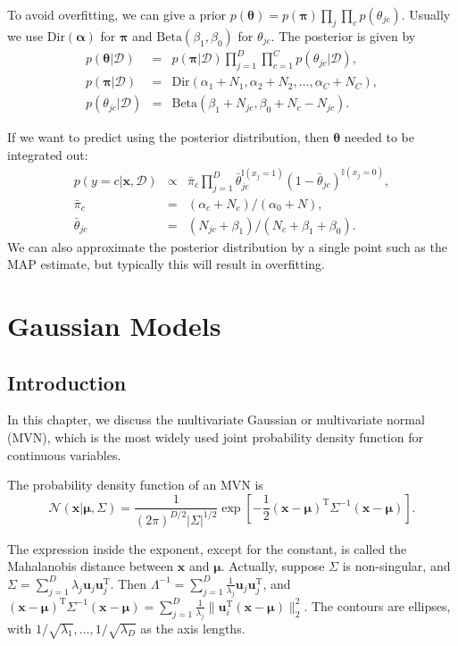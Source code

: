 \documentclass[openany]{book}
\begin{document}
To avoid overfitting, we can give a prior $p(\boldsymbol{\theta})=p(\boldsymbol{\pi})\prod_j\prod_cp(\theta_{jc})$. Usually we use $\mathrm{Dir}(\boldsymbol{\alpha})$ for $\boldsymbol{\pi}$ and $\mathrm{Beta}(\beta_1,\beta_0)$ for $\theta_{jc}$. The posterior is given by
\begin{eqnarray}
p(\boldsymbol{\theta}|\mathcal{D}) & = & p(\boldsymbol{\pi}|\mathcal{D})\prod_{j=1}^D\prod_{c=1}^Cp(\theta_{jc}|\mathcal{D}), \\
p(\boldsymbol{\pi}|\mathcal{D}) & = & \mathrm{Dir}(\alpha_1+N_1,\alpha_2+N_2,\ldots,\alpha_C+N_C), \\
p(\theta_{jc}|\mathcal{D}) & = & \mathrm{Beta}(\beta_1+N_{jc},\beta_0+N_c-N_{jc}).
\end{eqnarray}

If we want to predict using the posterior distribution, then $\boldsymbol{\theta}$ needed to be integrated out:
\begin{eqnarray}
p(y=c|\boldsymbol{x},\mathcal{D}) & \propto & \bar{\pi}_c\prod_{j=1}^D\bar{\theta}_{jc}^{\mathbb{I}(x_j=1)}(1-\bar{\theta}_{jc})^{\mathbb{I}(x_j=0)}, \\
\bar{\pi}_c & = & (\alpha_c+N_c)/(\alpha_0+N), \\
\bar{\theta}_{jc} & = & (N_{jc}+\beta_1)/(N_c+\beta_1+\beta_0).
\end{eqnarray}
We can also approximate the posterior distribution by a single point such as the MAP estimate, but typically this will result in overfitting.

\chapter{Gaussian Models}
\section{Introduction}
In this chapter, we discuss the multivariate Gaussian or multivariate normal (MVN), which is the most widely used joint probability density function for continuous variables.

The probability density function of an MVN is
\begin{equation}\label{mvnden}
\mathcal{N}(\mathbf{x}|\boldsymbol{\mu},\Sigma)=\frac{1}{(2\pi)^{D/2}|\Sigma|^{1/2}}\exp[-\frac{1}{2}(\mathbf{x}-\boldsymbol{\mu})^{\mathrm{T}}\Sigma^{-1}(\mathbf{x}-\boldsymbol{\mu})].
\end{equation}

The expression inside the exponent, except for the constant, is called the Mahalanobis distance between $\mathbf{x}$ and $\boldsymbol{\mu}$. Actually, suppose $\Sigma$ is non-singular, and $\Sigma=\sum_{j=1}^D\lambda_j\mathbf{u}_j\mathbf{u}_j^{\mathrm{T}}$. Then $\Lambda^{-1}=\sum_{j=1}^D\frac{1}{\lambda_j}\mathbf{u}_j\mathbf{u}_j^{\mathrm{T}}$, and $(\mathbf{x}-\boldsymbol{\mu})^{\mathrm{T}}\Sigma^{-1}(\mathbf{x}-\boldsymbol{\mu})=\sum_{j=1}^D\frac{1}{\lambda_j}\|\mathbf{u}_i^{\mathrm{T}}(\mathbf{x}-\boldsymbol{\mu})\|_2^2$. The contours are ellipses, with $1/\sqrt{\lambda_1},\ldots,1/\sqrt{\lambda_D}$ as the axis lengths.
\end{document}
